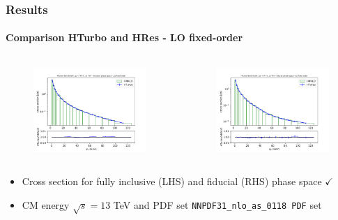 \documentclass[aspectratio=43]{beamer}
\begin{document}
\begin{frame}

	\frametitle{Results}
	\framesubtitle{Comparison HTurbo and HRes - LO fixed-order}
	
	\footnotesize
	
	\begin{columns}
		
		
		\begin{figure}
			\includegraphics[width = 7cm]{plots/part3/chapter6/nlo-fo-1.png}
		\end{figure}
		
		
		\begin{figure}
			\includegraphics[width = 7cm]{plots/part3/chapter6/nlo-fo-fid-1.png}
		\end{figure}
		
	\end{columns}
	
	\begin{itemize}
		\item Cross section for fully inclusive (LHS) and fiducial (RHS) phase space {\color{darkgreen}$\checkmark$} 
		\item CM energy $\sqrt s = 13$ TeV and PDF set \texttt{NNPDF31\_nlo\_as\_0118 PDF} set
	\end{itemize}

\end{frame}
\end{document}
